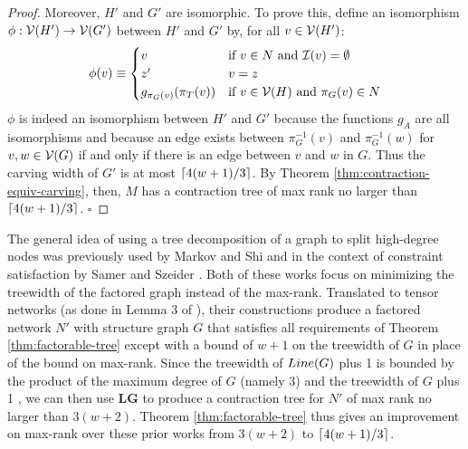 \begin{proof}
Moreover, $H'$ and $G'$ are isomorphic. To prove this, define an isomorphism $\phi: \mathcal{V}(H') \rightarrow \mathcal{V}(G')$ between $H'$ and $G'$ by, for all $v \in \mathcal{V}(H')$:
$$\phi(v) \equiv \begin{cases}v&\text{if}~v \in N~\text{and}~\mathcal{I}(v)=\emptyset\\z'&v=z\\g_{\pi_G(v)}(\pi_T(v))&\text{if}~v \in \mathcal{V}(H)~\text{and}~\pi_G(v) \in N\end{cases}$$
$\phi$ is indeed an isomorphism between $H'$ and $G'$ because the functions $g_A$ are all isomorphisms and because an edge exists between $\pi_G^{-1}(v)$ and $\pi_G^{-1}(w)$ for $v, w \in \mathcal{V}(G)$ if and only if there is an edge between $v$ and $w$ in $G$. Thus the carving width of $G'$ is at most $\lceil4(w+1)/3\rceil$. By Theorem \ref{thm:contraction-equiv-carving}, then, $M$ has a contraction tree of max rank no larger than $\lceil4(w+1)/3\rceil$.
\hfill$\square$
\end{proof}

The general idea of using a tree decomposition of a graph to split high-degree nodes was previously used by Markov and Shi \cite{MS11} and in the context of constraint satisfaction by Samer and Szeider \cite{SS10_2}. Both of these works focus on minimizing the treewidth of the factored graph instead of the max-rank. Translated to tensor networks (as done in Lemma 3 of \cite{oliveira18}), their constructions produce a factored network $N'$ with structure graph $G$ that satisfies all requirements of Theorem \ref{thm:factorable-tree} except with a bound of $w+1$ on the treewidth of $G$ in place of the bound on max-rank. Since the treewidth of $Line(G)$ plus 1 is bounded by the product of the maximum degree of $G$ (namely 3) and the treewidth of $G$ plus 1 \cite{MS08}, we can then use \textbf{LG} to produce a contraction tree for $N'$ of max rank no larger than $3(w+2)$. Theorem \ref{thm:factorable-tree} thus gives an improvement on max-rank over these prior works from $3(w+2)$ to $\lceil4(w+1)/3\rceil$.


